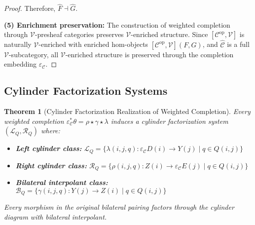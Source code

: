 \documentclass[11pt]{article}
\theoremstyle{plain}
\newtheorem{theorem}{Theorem}[section]
\theoremstyle{definition}
\theoremstyle{remark}
\newcommand{\V}{\mathcal{V}}
\newcommand{\C}{\mathcal{C}}
\newcommand{\op}{\mathrm{op}}
\newcommand{\wh}[1]{\widehat{#1}}
\begin{document}
\begin{proof}
Therefore, $\wh{F} \dashv \wh{G}$.

\textbf{(5) Enrichment preservation:}
The construction of weighted completion through $\V$-presheaf categories preserves $\V$-enriched structure. Since $[\C^{\op}, \V]$ is naturally $\V$-enriched with enriched hom-objects $[\C^{\op}, \V](F, G)$, and $\wh{\C}$ is a full $\V$-subcategory, all $\V$-enriched structure is preserved through the completion embedding $\varepsilon_\C$.
\end{proof}

\subsection{Cylinder Factorization Systems}

\begin{theorem}[Cylinder Factorization Realization of Weighted Completion]\label{thm:cylinder-factorization}
Every weighted completion $\varepsilon_\C^* \theta = \rho \star \gamma \star \lambda$ induces a cylinder factorization system $(\mathcal{L}_Q, \mathcal{R}_Q)$ where:
\begin{itemize}
\item \textbf{Left cylinder class:} $\mathcal{L}_Q = \{\lambda(i, j, q) : \varepsilon_\C D(i) \to Y(j) \mid q \in Q(i, j)\}$
\item \textbf{Right cylinder class:} $\mathcal{R}_Q = \{\rho(i, j, q) : Z(i) \to \varepsilon_\C E(j) \mid q \in Q(i, j)\}$
\item \textbf{Bilateral interpolant class:} $\mathcal{B}_Q = \{\gamma(i, j, q) : Y(j) \to Z(i) \mid q \in Q(i, j)\}$
\end{itemize}

Every morphism in the original bilateral pairing factors through the cylinder diagram with bilateral interpolant.
\end{theorem}
\end{document}

